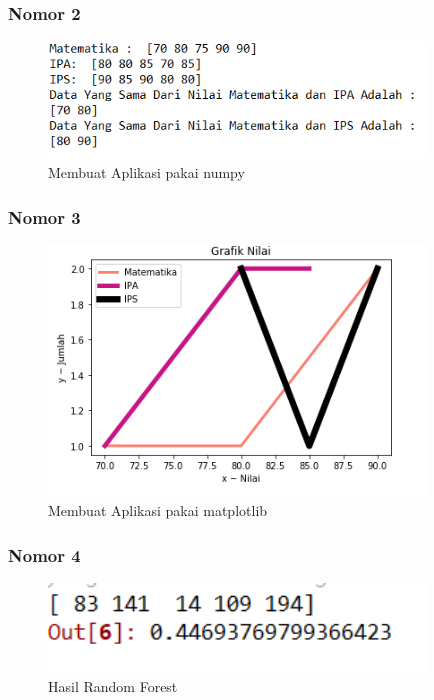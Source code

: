 \subsubsection{Nomor 2}
\hfill\break

\begin{figure}[H]
\centerline{\includegraphics[width=10cm]{figures/1174084/3/5.png}}
\caption{Membuat Aplikasi pakai numpy}
\label{labelgambar}
\end{figure}

\subsubsection{Nomor 3}
\hfill\break

\begin{figure}[H]
\centerline{\includegraphics[width=10cm]{figures/1174084/3/6.png}}
\caption{Membuat Aplikasi pakai matplotlib}
\label{labelgambar}
\end{figure}

\subsubsection{Nomor 4}
\hfill\break

\begin{figure}[H]
\centerline{\includegraphics[width=10cm]{figures/1174084/3/7.png}}
\caption{Hasil Random Forest}
\label{labelgambar}
\end{figure}

